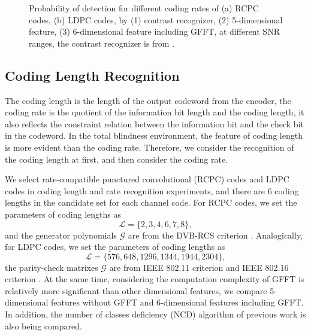 \documentclass[conference]{IEEEtran}
\begin{document}
\begin{figure}[tbp]
{		
	}
	\caption{Probability of detection for different coding rates of (a) RCPC codes, (b) LDPC codes, by (1) contrast recognizer, (2) 5-dimensional feature, (3) 6-dimensional feature including GFFT, at different SNR ranges, the contrast recognizer is from \cite{shen2021blind}.}
	\label{fig}
\end{figure}

\subsection{Coding Length Recognition}
The coding length is the length of the output codeword from the encoder, the coding rate is the quotient of the information bit length and the coding length, it also reflects the constraint relation between the information bit and the check bit in the codeword. In the total blindness environment, the feature of coding length is more evident than the coding rate. Therefore, we consider the recognition of the coding length at first, and then consider the coding rate.

We select rate-compatible punctured convolutional  (RCPC) codes and LDPC codes in coding length and rate recognition experiments, and there are 6 coding lengths in the candidate set for each channel code. For RCPC codes, we set the parameters of coding lengths as
\begin{equation}
	\mathcal{L} = \{2, 3, 4, 6, 7, 8\},
\end{equation}
and the generator polynomials $\mathcal{G}$ are from the DVB-RCS criterion \cite{Interaction2009}. Analogically, for LDPC codes, we set the parameters of coding lengths as
\begin{equation}
	\mathcal{L} = \{576, 648, 1296, 1344, 1944, 2304\},
\end{equation}
the parity-check matrixes $\mathcal{G}$ are from IEEE 802.11 criterion \cite{IEEE2012802} and  IEEE 802.16 criterion \cite{IEEE2013802}. At the same time, considering the computation complexity of GFFT is relatively more significant than other dimensional features, we compare 5-dimensional features without GFFT and 6-dimensional features including GFFT. In addition, the number of classes deficiency (NCD) algorithm of previous work \cite{bonvard2018classification} is also being compared.
\end{document}

